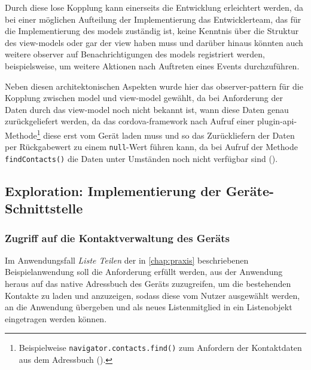 Durch diese lose Kopplung kann einerseits die Entwicklung erleichtert werden, da bei einer möglichen Aufteilung der Implementierung das Entwicklerteam, das für die Implementierung des \glspl{model} zuständig ist, keine Kenntnis über die Struktur des \glspl{view-model} oder gar der \gls{view} haben muss und darüber hinaus könnten auch weitere \gls{observer} auf Benachrichtigungen des \glspl{model} registriert werden, beispielsweise, um weitere Aktionen nach Auftreten eines Events durchzuführen.

Neben diesen architektonischen Aspekten wurde hier das \gls{observer-pattern} für die Kopplung zwischen \gls{model} und \gls{view-model} gewählt, da bei Anforderung der Daten durch das \gls{view-model} noch nicht bekannt ist, wann diese Daten genau zurückgeliefert werden, da das \gls{cordova}-\gls{framework} nach Aufruf einer \gls{plugin}-\gls{api}-Methode\footnote{Beispielweise \lstinline|navigator.contacts.find()| zum Anfordern der Kontaktdaten aus dem Adressbuch ().} diese erst vom Gerät laden muss und so das Zurückliefern der Daten per Rückgabewert zu einem \lstinline|null|-Wert führen kann, da bei Aufruf der Methode \lstinline|findContacts()| die Daten unter Umständen noch nicht verfügbar sind ().




\subsection{Exploration: Implementierung der Geräte-Schnittstelle}

		
\subsubsection{Zugriff auf die Kontaktverwaltung des Geräts} \label{sec:contacts}

Im Anwendungsfall \emph{Liste Teilen} der in \autoref{chap:praxis} beschriebenen Beispielanwendung  soll die Anforderung erfüllt werden, aus der Anwendung heraus auf das native Adressbuch des Geräts zuzugreifen, um die bestehenden Kontakte zu laden und anzuzeigen, sodass diese vom Nutzer ausgewählt werden, an die Anwendung übergeben und als neues Listenmitglied in ein Listenobjekt eingetragen werden können.

